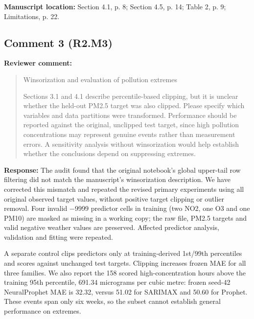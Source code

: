 \documentclass[11pt,a4paper]{article}
\begin{document}
\textbf{Manuscript location:} Section 4.1, p. 8; Section 4.5, p. 14; Table 2, p. 9; Limitations, p. 22.
\begin{samepage}
\subsection*{Comment 3 (R2.M3)}
\textbf{Reviewer comment:}
\begin{quote}\small Winsorization and evaluation of pollution extremes

Sections 3.1 and 4.1 describe percentile-based clipping, but it is unclear whether the held-out PM2.5 target was also clipped. Please specify which variables and data partitions were transformed. Performance should be reported against the original, unclipped test target, since high pollution concentrations may represent genuine events rather than measurement errors. A sensitivity analysis without winsorization would help establish whether the conclusions depend on suppressing extremes.\end{quote}
\end{samepage}
\textbf{Response:}
The audit found that the original notebook's global upper-tail row filtering did not match the manuscript's winsorization description. We have corrected this mismatch and repeated the revised primary experiments using all original observed target values, without positive target clipping or outlier removal. Four invalid $-$9999 predictor cells in training (two NO2, one O3 and one PM10) are masked as missing in a working copy; the raw file, PM2.5 targets and valid negative weather values are preserved. Affected predictor analysis, validation and fitting were repeated.

A separate control clips predictors only at training-derived 1st/99th percentiles and scores against unchanged test targets. Clipping increases frozen MAE for all three families. We also report the 158 scored high-concentration hours above the training 95th percentile, 691.34 micrograms per cubic metre: frozen seed-42 NeuralProphet MAE is 32.32, versus 51.02 for SARIMAX and 50.60 for Prophet. These events span only six weeks, so the subset cannot establish general performance on extremes.
\end{document}
